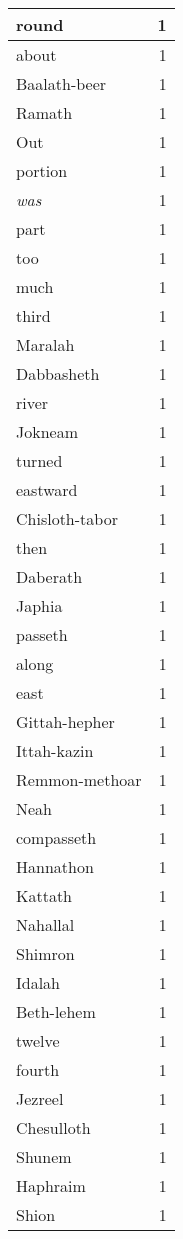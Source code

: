 \begin{center}
\begin{longtable}{l|r}
round & 1\\ \hline 
about & 1\\ \hline 
Baalath-beer & 1\\ \hline 
Ramath & 1\\ \hline 
Out & 1\\ \hline 
portion & 1\\ \hline 
\emph{was} & 1\\ \hline 
part & 1\\ \hline 
too & 1\\ \hline 
much & 1\\ \hline 
third & 1\\ \hline 
Maralah & 1\\ \hline 
Dabbasheth & 1\\ \hline 
river & 1\\ \hline 
Jokneam & 1\\ \hline 
turned & 1\\ \hline 
eastward & 1\\ \hline 
Chisloth-tabor & 1\\ \hline 
then & 1\\ \hline 
Daberath & 1\\ \hline 
Japhia & 1\\ \hline 
passeth & 1\\ \hline 
along & 1\\ \hline 
east & 1\\ \hline 
Gittah-hepher & 1\\ \hline 
Ittah-kazin & 1\\ \hline 
Remmon-methoar & 1\\ \hline 
Neah & 1\\ \hline 
compasseth & 1\\ \hline 
Hannathon & 1\\ \hline 
Kattath & 1\\ \hline 
Nahallal & 1\\ \hline 
Shimron & 1\\ \hline 
Idalah & 1\\ \hline 
Beth-lehem & 1\\ \hline 
twelve & 1\\ \hline 
fourth & 1\\ \hline 
Jezreel & 1\\ \hline 
Chesulloth & 1\\ \hline 
Shunem & 1\\ \hline 
Haphraim & 1\\ \hline 
Shion & 1\\ \hline 

\end{longtable}
\end{center}

